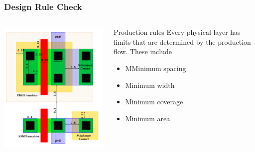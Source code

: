 \documentclass[compress]{beamer}
\begin{document}
\begin{frame}
	\frametitle{Design Rule Check}
	\begin{columns}	
		\begin{center}
			\includegraphics[width=\textwidth]{DRC_1}
		\end{center}
		\begin{block}{Production rules}
			Every physical layer has limits that are determined by the production flow. These include
			\begin{itemize}
				\item MMinimum spacing
				\item Minimum width
				\item Minimum coverage
				\item Minimum area
			\end{itemize}
		\end{block}
	\end{columns}
\end{frame}
\end{document}
